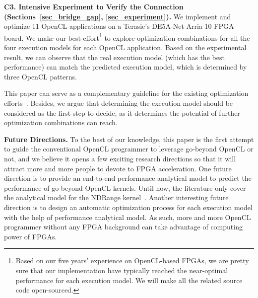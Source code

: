 %
\vspace{0.4em}
\noindent
{\bf C3. Intensive Experiment to Verify the Connection (Sections~\ref{sec_bridge_gap}, \ref{sec_experiment}). }We implement and optimize 11 OpenCL applications on a Terasic\textquoteright s DE5A-Net Arria 10 FPGA board. We make our best effort\footnote{Based on our five years' experience on OpenCL-based FPGAs, we are pretty sure that our implementation have typically reached the near-optimal performance for each execution model. We will make all the related source code open-sourced. } to explore optimization combinations for all the four execution models for each OpenCL application. Based on the experimental result, we can observe that the real execution model (which has the best performance) can match the predicted execution model, which is determined by three OpenCL patterns. %

\vspace{0.7em}
This paper can serve as a complementary guideline for the existing optimization efforts~\cite{flexcl_tc18, opencl_compiler_ERSA12, fpga_opencl_model_hpca16}. Besides, we argue that determining the execution model should be considered as the first step to decide, as it determines the potential of further optimization combinations can reach. 

\vspace{0.5em}
\noindent
{\bf Future Directions. } 
To the best of our knowledge, this paper is the first attempt to guide the conventional OpenCL programmer to leverage go-beyond OpenCL or not, and we believe it opens a few exciting research directions so that it will attract more and more people to devote to FPGA acceleration. One future direction is to provide an end-to-end performance analytical model to predict the performance of go-beyond OpenCL kernels. Until now, the literature only cover the analytical model for the NDRange kernel~\cite{fpga_opencl_model_hpca16, flexcl_tc18}. 
Another interesting future direction is to design an automatic optimization process for each execution model with the help of performance analytical model. As such, more and more OpenCL programmer without any FPGA background can take advantage of computing power of FPGAs. 

